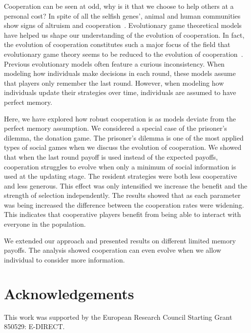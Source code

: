 \documentclass[11pt]{article}
\theoremstyle{plainCl1}
\theoremstyle{plainCl2}
\begin{document}
Cooperation can be seen at odd, why is it that we choose to help others at a
personal cost? In spite of all the selfish genes', animal and human communities
show signs of altruism and cooperation~\cite{milinski1987tit, kerr2002local,
carter2020development}. Evolutionary game theoretical models have helped us
shape our understanding of the evolution of cooperation. In fact, the evolution
of cooperation constitutes such a major focus of the field that evolutionary
game theory seems to be reduced to the evolution of
cooperation~\cite{Traulsen:PhilTrans:2022}. Previous evolutionary models often
feature a curious inconsistency. When modeling how individuals make decisions in
each round, these models assume that players only remember the last round.
However, when modeling how individuals update their strategies over time,
individuals are assumed to have perfect memory.

Here, we have explored how robust cooperation is as models deviate from the
perfect memory assumption. We considered a special case of the prisoner's
dilemma, the donation game. The prisoner's dilemma is one of the most applied
types of social games when we discuss the evolution of cooperation. We showed
that when the last round payoff is used instead of the expected payoffs,
cooperation struggles to evolve  when only a minimum of social information is
used at the updating stage. The resident strategies were both less cooperative
and less generous. This effect was only intensified we increase the benefit and
the strength of selection independently. The results showed that as each
parameter was being increased the difference between the cooperation rates were
widening. This indicates that cooperative players benefit from being able to
interact with everyone in the population.

We extended our approach and presented results on different limited memory
payoffs. The analysis showed cooperation can even evolve when we allow
individual to consider more information.

\section{Acknowledgements}

This work was supported by the European Research Council Starting Grant 850529:
E-DIRECT.



\end{document}

